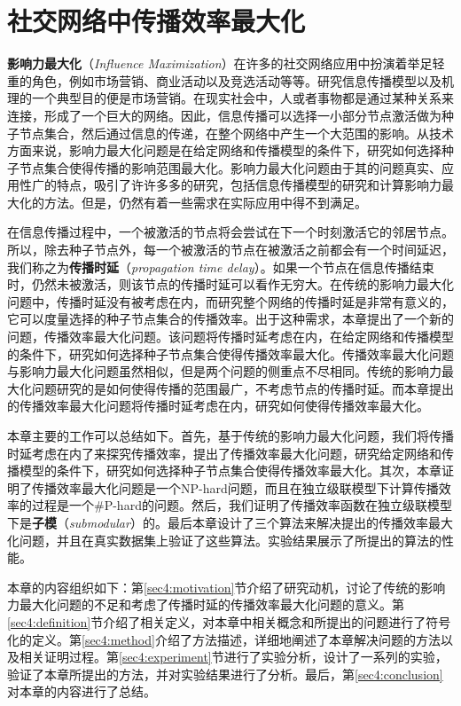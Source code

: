\chapter{社交网络中传播效率最大化}
\label{chap4:main}
\textbf{影响力最大化}（\textit{Influence Maximization}）在许多的社交网络应用中扮演着举足轻重的角色，例如市场营销、商业活动以及竞选活动等等。研究信息传播模型以及机理的一个典型目的便是市场营销。在现实社会中，人或者事物都是通过某种关系来连接，形成了一个巨大的网络。因此，信息传播可以选择一小部分节点激活做为种子节点集合，然后通过信息的传递，在整个网络中产生一个大范围的影响。从技术方面来说，影响力最大化问题是在给定网络和传播模型的条件下，研究如何选择种子节点集合使得传播的影响范围最大化。影响力最大化问题由于其的问题真实、应用性广的特点，吸引了许许多多的研究，包括信息传播模型的研究和计算影响力最大化的方法。但是，仍然有着一些需求在实际应用中得不到满足。

在信息传播过程中，一个被激活的节点将会尝试在下一个时刻激活它的邻居节点。所以，除去种子节点外，每一个被激活的节点在被激活之前都会有一个时间延迟，我们称之为\textbf{传播时延}（\textit{propagation time delay}）。如果一个节点在信息传播结束时，仍然未被激活，则该节点的传播时延可以看作无穷大。在传统的影响力最大化问题中，传播时延没有被考虑在内，而研究整个网络的传播时延是非常有意义的，它可以度量选择的种子节点集合的传播效率。出于这种需求，本章提出了一个新的问题，传播效率最大化问题。该问题将传播时延考虑在内，在给定网络和传播模型的条件下，研究如何选择种子节点集合使得传播效率最大化。传播效率最大化问题与影响力最大化问题虽然相似，但是两个问题的侧重点不尽相同。传统的影响力最大化问题研究的是如何使得传播的范围最广，不考虑节点的传播时延。而本章提出的传播效率最大化问题将传播时延考虑在内，研究如何使得传播效率最大化。

本章主要的工作可以总结如下。首先，基于传统的影响力最大化问题，我们将传播时延考虑在内了来探究传播效率，提出了传播效率最大化问题，研究给定网络和传播模型的条件下，研究如何选择种子节点集合使得传播效率最大化。其次，本章证明了传播效率最大化问题是一个NP-hard问题，而且在独立级联模型下计算传播效率的过程是一个\#P-hard的问题。然后，我们证明了传播效率函数在独立级联模型下是\textbf{子模}（\textit{submodular}）的。最后本章设计了三个算法来解决提出的传播效率最大化问题，并且在真实数据集上验证了这些算法。实验结果展示了所提出的算法的性能。

本章的内容组织如下：第\ref{sec4:motivation}节介绍了研究动机，讨论了传统的影响力最大化问题的不足和考虑了传播时延的传播效率最大化问题的意义。第\ref{sec4:definition}节介绍了相关定义，对本章中相关概念和所提出的问题进行了符号化的定义。第\ref{sec4:method}介绍了方法描述，详细地阐述了本章解决问题的方法以及相关证明过程。第\ref{sec4:experiment}节进行了实验分析，设计了一系列的实验，验证了本章所提出的方法，并对实验结果进行了分析。最后，第\ref{sec4:conclusion}对本章的内容进行了总结。

